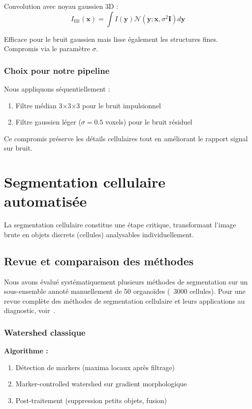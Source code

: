 Convolution avec noyau gaussien 3D :
\[
I_{\text{filt}}(\mathbf{x}) = \int I(\mathbf{y}) \mathcal{N}(\mathbf{y}; \mathbf{x}, \sigma^2 \mathbf{I}) d\mathbf{y}
\]

Efficace pour le bruit gaussien mais lisse également les structures fines. Compromis via le paramètre $\sigma$.

\subsubsection{Choix pour notre pipeline}

Nous appliquons séquentiellement :
\begin{enumerate}
    \item Filtre médian 3×3×3 pour le bruit impulsionnel
    \item Filtre gaussien léger ($\sigma = 0.5$ voxels) pour le bruit résiduel
\end{enumerate}

Ce compromis préserve les détails cellulaires tout en améliorant le rapport signal sur bruit.

\section{Segmentation cellulaire automatisée}

La segmentation cellulaire constitue une étape critique, transformant l'image brute en objets discrets (cellules) analysables individuellement.

\subsection{Revue et comparaison des méthodes}

Nous avons évalué systématiquement plusieurs méthodes de segmentation sur un sous-ensemble annoté manuellement de 50 organoïdes (~3000 cellules). Pour une revue complète des méthodes de segmentation cellulaire et leurs applications au diagnostic, voir~\cite{Nunes2024,Rayed2024,Wang2022Segmentation}.

\subsubsection{Watershed classique}

\textbf{Algorithme :}
\begin{enumerate}
    \item Détection de markers (maxima locaux après filtrage)
    \item Marker-controlled watershed sur gradient morphologique
    \item Post-traitement (suppression petits objets, fusion)
\end{enumerate}

